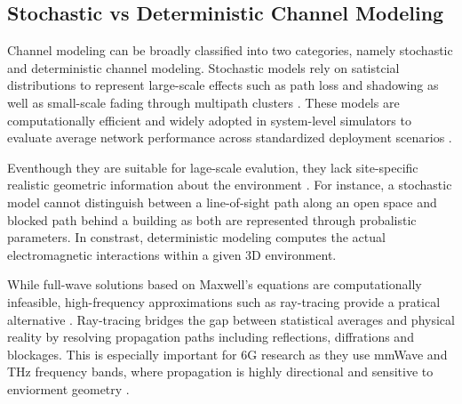 \subsection{Stochastic vs Deterministic Channel Modeling}
Channel modeling can be broadly classified into two categories, namely stochastic and deterministic channel modeling.
Stochastic models rely on satistcial distributions to represent large-scale effects such as path loss and shadowing as well as small-scale fading through multipath clusters \cite{tr38901}.
These models are computationally efficient and widely adopted in system-level simulators to evaluate average network performance across standardized deployment scenarios \cite{tr38901,5glena}.

Eventhough they are suitable for lage-scale evalution, they lack site-specific realistic geometric information about the environment \cite{alsamman_mmwave,han_thz}.
For instance, a stochastic model cannot distinguish between a line-of-sight path along an open space and blocked path behind a building as both are represented through probalistic parameters.
In constrast, deterministic modeling computes the actual electromagnetic interactions within a given 3D environment.

While full-wave solutions based on Maxwell's equations are computationally infeasible, high-frequency approximations such as ray-tracing provide a pratical alternative \cite{alsamman_mmwave,han_thz}.
Ray-tracing bridges the gap between statistical averages and physical reality by resolving propagation paths including reflections, diffrations and blockages.
This is especially important for 6G research as they use mmWave and THz frequency bands, where propagation is highly directional and sensitive to enviorment geometry \cite{uwaechia_mmwave,han_thz}.
